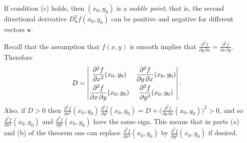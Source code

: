 
If condition (c) holds, then $(x_0,y_0)$ is a \emph{saddle point};
that is, the second directional derivative 
$D^2_\mathbf{v}f(x_0,y_0)$ can be positive and negative for different vectors $\mathbf{v}$.

Recall that the assumption that $f(x,y)$ is smooth implies that $\frac{\partial^2 f}{\partial y \, \partial x} = \frac{\partial^2 f}{\partial x \, \partial y}$. Therefore
\begin{displaymath}
 D =
 \begin{vmatrix}
  \dfrac{\partial^2 f}{\partial x^2}(x_0,y_0) & \dfrac{\partial^2 f}{\partial y \, \partial x}(x_0,y_0)\smallskip\\
  \dfrac{\partial^2 f}{\partial x \, \partial y}(x_0,y_0) & \dfrac{\partial^2 f}{\partial y^2}(x_0,y_0)
 \end{vmatrix}.
\end{displaymath} 
Also, if $D > 0$
then $\frac{\partial^2 f}{\partial x^2}(x_0,y_0) \, \frac{\partial^2 f}{\partial y^2}(x_0,y_0) = D +
\biggl( \frac{\partial^2 f}{\partial y \, \partial x}(x_0,y_0) \biggr)^2 > 0$, and so
$\frac{\partial^2 f}{\partial x^2}(x_0,y_0)$ and $\frac{\partial^2 f}{\partial y^2}(x_0,y_0)$ have the same sign. 
This means
that in parts (a) and (b) of the theorem one can replace $\frac{\partial^2 f}{\partial x^2}(x_0,y_0)$ by
$\frac{\partial^2 f}{\partial y^2}(x_0,y_0)$ if desired.

